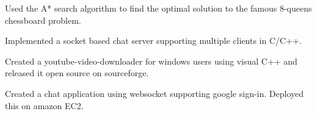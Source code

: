 



\begin{cventries}

\cvproject
{
    \begin{cvitems} %
        \item {Used the A* search algorithm to find the optimal solution to the famous 8-queens chessboard problem.}
        \item {Implemented a socket based chat server supporting multiple clients in C/C++.}
        \item {Created a youtube-video-downloader for windows users using visual C++ and released it open source on sourceforge.}
        \item {Created a chat application using websocket supporting google sign-in. Deployed this on amazon EC2.}
        \end{cvitems}
}

\end{cventries}
